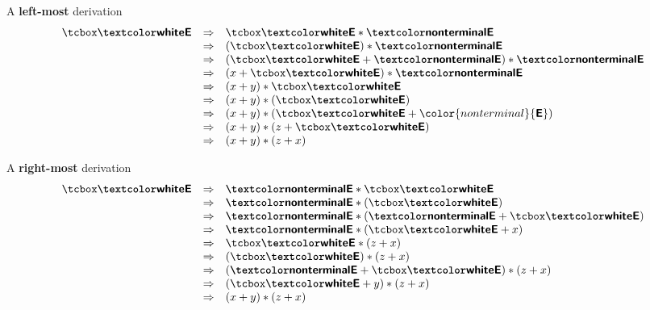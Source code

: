 \begin{minipage}[t]{.5\textwidth}
    A \textbf{left-most} derivation
    \[
        \begin{array}{rcl}
          {\selectedNonTerminal{E}} &\Rightarrow& {\selectedNonTerminal{E} * \nonterminal{E}} \\
            &\Rightarrow& (\selectedNonTerminal{E}) * \nonterminal{E}\\
            &\Rightarrow& (\selectedNonTerminal{E} + \nonterminal{E}) * \nonterminal{E} \\
            &\Rightarrow& (x+ \selectedNonTerminal{E}) * \nonterminal{E}\\
            &\Rightarrow& (x+y)* \selectedNonTerminal{E}\\
            &\Rightarrow& (x+y)*( \selectedNonTerminal{E} )\\
            &\Rightarrow& (x+y)*(\selectedNonTerminal{E} +{\color{nonterminal}{\textbf{\textsf{E}}}})\\
            &\Rightarrow& (x+y)*(z+ \selectedNonTerminal{E})\\
            &\Rightarrow& (x+y)*(z+x)\\
        \end{array}
        \]
\end{minipage}%
\begin{minipage}[t]{.5\textwidth}
    A \textbf{right-most} derivation
    \[\begin{array}{rcl}
        \selectedNonTerminal{E} &\Rightarrow& \nonterminal{E} * \selectedNonTerminal{E} \\
          &\Rightarrow& \nonterminal{E} * ( \selectedNonTerminal{E} )\\
          &\Rightarrow& \nonterminal{E} * ( \nonterminal{E} + \selectedNonTerminal{E} )\\
          &\Rightarrow& \nonterminal{E} * ( \selectedNonTerminal{E} + x )\\
          &\Rightarrow& \selectedNonTerminal{E} * ( z + x ) \\
          &\Rightarrow& (\selectedNonTerminal{E}) * ( z + x )\\
          &\Rightarrow& (\nonterminal{E} + \selectedNonTerminal{E} )*(z+x)\\
          &\Rightarrow& (\selectedNonTerminal{E}+y)*(z+x)\\
          &\Rightarrow& (x+y)*(z+x)\\
      \end{array}\]
\end{minipage}

